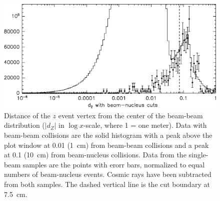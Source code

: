 \documentclass{cornell}
\begin{document}
\begin{figure}[p]
  \begin{center}
    \includegraphics[width=\linewidth]{dxydzcontaminationb}
  \end{center}
  \caption[Projecting beam-nucleus magnitude into accepted data using
  the single-beam samples]{\label{dxydzcontaminationb} Distance of the $z$ event
  vertex from the center of the beam-beam distribution ($|d_Z|$ in
  $\log x$-scale, where 1 = one meter).  Data with beam-beam
  collisions are the solid histogram with a peak above the plot window
  at 0.01 (1~cm) from beam-beam collisions and a peak at 0.1 (10~cm)
  from beam-nucleus collisions.  Data from the single-beam samples are
  the points with erorr bars, normalized to equal numbers of
  beam-nucleus events.  Cosmic rays have been subtracted from both
  samples.  The dashed vertical line is the cut boundary at 7.5~cm.}
\end{figure}
\end{document}
